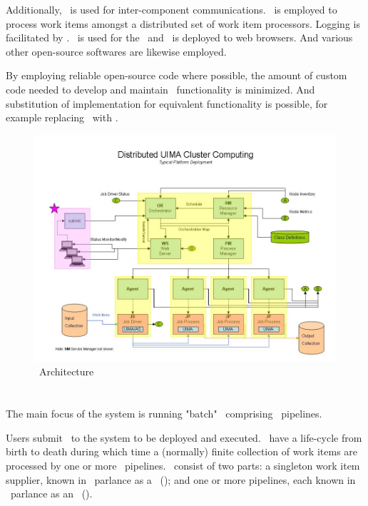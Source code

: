     Additionally, \varCamel~is used for inter-component communications.
    \varActiveMQ~is employed to process work items amongst a distributed set of work item processors.
    Logging is facilitated by \varLogger. \varJetty~is used for the \varWebServer~and \varjQuery~is deployed
    to web browsers.  And various other open-source softwares are likewise employed.
    
    By employing reliable open-source code where possible, the amount of custom code needed
    to develop and maintain \varDUCC~functionality is minimized. And substitution of implementation
    for equivalent functionality is possible, for example replacing \varApacheActiveMQ~with 
    \varIBMWebSphereMQ.
    
    \begin{figure}[h]
    \centering
    \includegraphics[width=6.5in]{images/ducc-arch.jpg}
    \caption{\varDUCC~Architecture}
    \label{fig:\varDUCC~Architecture}
    \end{figure}

    \section{\varJobs}

    The main focus of the system is running "batch" \varJobs~comprising \varUIMA~pipelines.
    
    Users submit \varJobs~to the system to be deployed and executed. \varJobs~have a
    life-cycle from birth to death during which time a (normally) finite collection of
    work items are processed by one or more \varUIMA~pipelines. \varJobs~consist of two
    parts: a singleton work item supplier, known in \varUIMA~parlance as a
    \varCollectionReader~(\varCR); and one or more pipelines, each known in \varUIMA~parlance
    as an \varAnalysisEngine~(\varAE).
        
